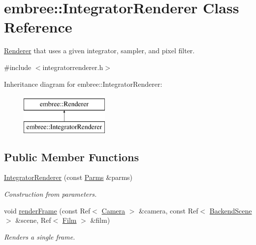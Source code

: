 \hypertarget{classembree_1_1_integrator_renderer}{
\section{embree::IntegratorRenderer Class Reference}
\label{classembree_1_1_integrator_renderer}
}


\hyperlink{classembree_1_1_renderer}{Renderer} that uses a given integrator, sampler, and pixel filter.  




{\ttfamily \#include $<$integratorrenderer.h$>$}

Inheritance diagram for embree::IntegratorRenderer:\begin{figure}[H]
\begin{center}
\leavevmode
\includegraphics[height=2.000000cm]{classembree_1_1_integrator_renderer}
\end{center}
\end{figure}
\subsection*{Public Member Functions}
\begin{DoxyCompactItemize}
\item 
\hyperlink{classembree_1_1_integrator_renderer_a2faa4a51722b5103241d8e1f376a128b}{IntegratorRenderer} (const \hyperlink{classembree_1_1_parms}{Parms} \&parms)
\begin{DoxyCompactList}\small\item\em Construction from parameters. \item\end{DoxyCompactList}\item 
void \hyperlink{classembree_1_1_integrator_renderer_a65864dbadddc1920c3ad6269bae24c67}{renderFrame} (const Ref$<$ \hyperlink{classembree_1_1_camera}{Camera} $>$ \&camera, const Ref$<$ \hyperlink{classembree_1_1_backend_scene}{BackendScene} $>$ \&scene, Ref$<$ \hyperlink{classembree_1_1_film}{Film} $>$ \&film)
\begin{DoxyCompactList}\small\item\em Renders a single frame. \item\end{DoxyCompactList}\end{DoxyCompactItemize}



